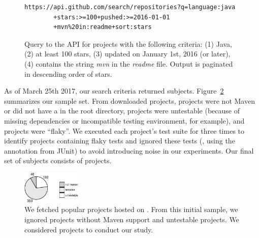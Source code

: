 \vspace{1ex}
\begin{figure}[h!]
\centering
\scriptsize
{}
\begin{lstlisting}
https://api.github.com/search/repositories?q=language:java
        +stars:>=100+pushed:>=2016-01-01
        +mvn%20in:readme+sort:stars
\end{lstlisting}
    \caption{\label{fig:subject-query} Query to the \github{} API for
    projects with the following criteria: (1) Java, (2) at least 100
    stars, (3) updated on January 1st, 2016 (or later), (4) contains
    the string \emph{mvn} in the \emph{readme} file. Output is
    paginated in descending order of stars.}
\end{figure}

As of March 25th 2017, our search criteria returned \SubjectsGithub{}
subjects. Figure~\ref{fig:subjects} summarizes our sample set. From
\SubjectsGithub{} downloaded projects, \SubjectsGithubNotMaven{}
projects were not Maven or did not have a \pomf{} in the root
directory, \SubjectsGithubNotTestable{} projects were untestable
(because of missing dependencies or incompatible testing environment,
for example), and \SubjectsGithubFlaky{} projects were ``flaky''.
 We executed each project's
test suite for three times to identify projects containing flaky tests
and ignored these tests (\ie, using the  annotation
from JUnit) to avoid introducing noise in our experiments.  Our final
set of subjects consists of \numSubjs{} projects.

\begin{figure}[ht]
    \centering
    \includegraphics[width=0.25\textwidth]{plots/subjs.pdf}
    \caption{\label{fig:subjects}We fetched \SubjectsGithub{} popular
    projects hosted on \github{}. From this initial sample, we ignored
    \SubjectsGithubNotMaven{} projects without Maven support and
    \SubjectsGithubNotTestable{} untestable projects. We considered
    \numSubjs{} projects to conduct our study.}
\end{figure}

